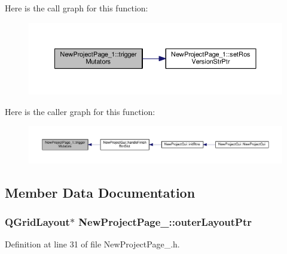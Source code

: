 Here is the call graph for this function\-:
\nopagebreak
\begin{figure}[H]
\begin{center}
\leavevmode
\includegraphics[width=350pt]{class_new_project_page__1_ac71e31a9a906f731b70711346bfa262d_cgraph}
\end{center}
\end{figure}




Here is the caller graph for this function\-:
\nopagebreak
\begin{figure}[H]
\begin{center}
\leavevmode
\includegraphics[width=350pt]{class_new_project_page__1_ac71e31a9a906f731b70711346bfa262d_icgraph}
\end{center}
\end{figure}




\subsection{Member Data Documentation}
\hypertarget{class_new_project_page__1_a809165b50ce35fa0812179209aba9294}{
\subsubsection[{outer\-Layout\-Ptr}]{\setlength{\rightskip}{0pt plus 5cm}Q\-Grid\-Layout$\ast$ New\-Project\-Page\-\_\-::outer\-Layout\-Ptr\hspace{0.3cm}{\ttfamily [private]}}}\label{class_new_project_page__1_a809165b50ce35fa0812179209aba9294}


Definition at line 31 of file New\-Project\-Page\-\_.\-h.

